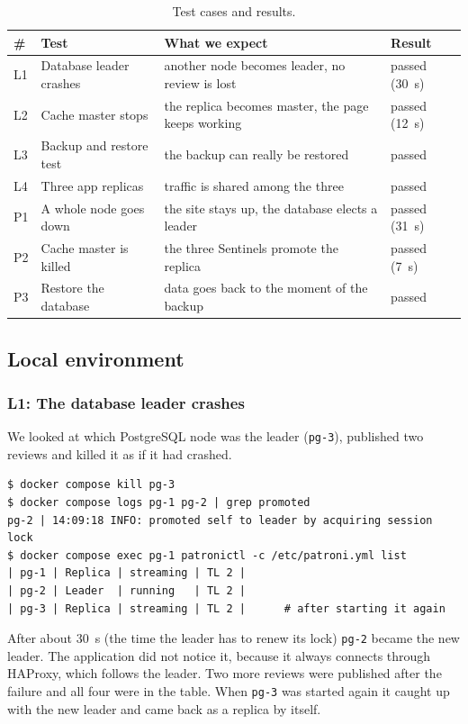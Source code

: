 \documentclass[11pt,a4paper]{article}
\newcommand{\svc}[1]{\texttt{#1}}
\begin{document}
\begin{table}[H]
\centering\small
\begin{tabularx}{\textwidth}{@{}llYl@{}}
\toprule
\textbf{\#} & \textbf{Test} & \textbf{What we expect} & \textbf{Result} \\
\midrule
L1 & Database leader crashes & another node becomes leader, no review is lost & passed (30~s) \\
L2 & Cache master stops & the replica becomes master, the page keeps working & passed (12~s) \\
L3 & Backup and restore test & the backup can really be restored & passed \\
L4 & Three app replicas & traffic is shared among the three & passed \\
\midrule
P1 & A whole node goes down & the site stays up, the database elects a leader & passed (31~s) \\
P2 & Cache master is killed & the three Sentinels promote the replica & passed (7~s) \\
P3 & Restore the database & data goes back to the moment of the backup & passed \\
\bottomrule
\end{tabularx}
\caption{Test cases and results.}
\label{tab:tests}
\end{table}

\subsection{Local environment}

\subsubsection*{L1: The database leader crashes}

We looked at which PostgreSQL node was the leader (\svc{pg-3}), published two reviews and
killed it as if it had crashed.
\begin{lstlisting}
$ docker compose kill pg-3
$ docker compose logs pg-1 pg-2 | grep promoted
pg-2 | 14:09:18 INFO: promoted self to leader by acquiring session lock
$ docker compose exec pg-1 patronictl -c /etc/patroni.yml list
| pg-1 | Replica | streaming | TL 2 |
| pg-2 | Leader  | running   | TL 2 |
| pg-3 | Replica | streaming | TL 2 |      # after starting it again
\end{lstlisting}
After about 30~s (the time the leader has to renew its lock) \svc{pg-2} became the new
leader. The application did not notice it, because it always connects through HAProxy,
which follows the leader. Two more reviews were published after the failure and all four
were in the table. When \svc{pg-3} was started again it caught up with the new leader and
came back as a replica by itself.
\end{document}
